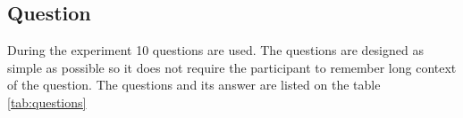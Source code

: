 \subsection{Question}
During the experiment 10 questions are used. The questions are designed as simple as possible so it does not require the participant to remember long context of the question.
The questions and its answer are listed on the table \ref{tab:questions}


